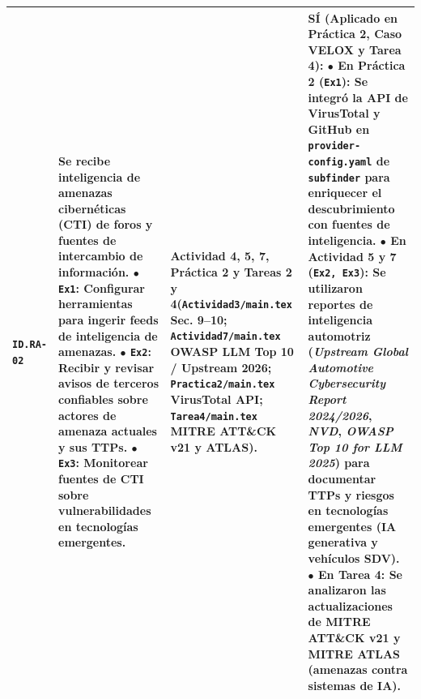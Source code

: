 \documentclass[letterpaper,11pt]{article}
\begin{document}
\begin{longtable}{|C{1.5cm}|L{5.3cm}|L{4.3cm}|L{5.8cm}|}
\texttt{ID.RA-02} &
\textbf{Se recibe inteligencia de amenazas cibernéticas (CTI) de foros y fuentes de intercambio de información.}\newline
$\bullet$ \texttt{Ex1}: Configurar herramientas para ingerir feeds de inteligencia de amenazas.\newline
$\bullet$ \texttt{Ex2}: Recibir y revisar avisos de terceros confiables sobre actores de amenaza actuales y sus \textbf{TTPs}.\newline
$\bullet$ \texttt{Ex3}: Monitorear fuentes de CTI sobre vulnerabilidades en tecnologías emergentes. &
\textbf{Actividad 4, 5, 7, Práctica 2 y Tareas 2 y 4}\newline (\texttt{Actividad3/main.tex} Sec. 9--10; \texttt{Actividad7/main.tex} OWASP LLM Top 10 / Upstream 2026; \texttt{Practica2/main.tex} VirusTotal API; \texttt{Tarea4/main.tex} MITRE ATT\&CK v21 y ATLAS). &
\textbf{SÍ (Aplicado en Práctica 2, Caso VELOX y Tarea 4):}\newline
$\bullet$ \textbf{En Práctica 2 (\texttt{Ex1}):} Se integró la API de \textbf{VirusTotal} y \textbf{GitHub} en \texttt{provider-config.yaml} de \texttt{subfinder} para enriquecer el descubrimiento con fuentes de inteligencia.\newline
$\bullet$ \textbf{En Actividad 5 y 7 (\texttt{Ex2, Ex3}):} Se utilizaron reportes de inteligencia automotriz (\textit{Upstream Global Automotive Cybersecurity Report 2024/2026}, \textit{NVD}, \textit{OWASP Top 10 for LLM 2025}) para documentar TTPs y riesgos en tecnologías emergentes (IA generativa y vehículos SDV).\newline
$\bullet$ \textbf{En Tarea 4:} Se analizaron las actualizaciones de \textbf{MITRE ATT\&CK v21} y \textbf{MITRE ATLAS} (amenazas contra sistemas de IA). \\
\hline


\end{longtable}
\end{document}
